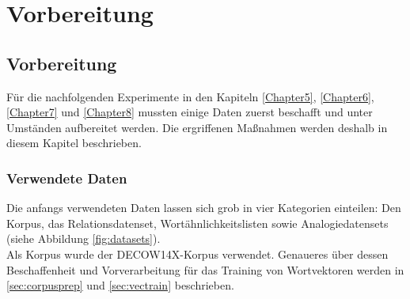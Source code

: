 
\chapter{Vorbereitung} %

\label{Chapter4} %


\section{Vorbereitung}

  Für die nachfolgenden Experimente in den Kapiteln \ref{Chapter5}, \ref{Chapter6}, \ref{Chapter7} und \ref{Chapter8}
  mussten einige Daten zuerst beschafft und unter Umständen aufbereitet werden. Die ergriffenen Maßnahmen werden
  deshalb in diesem Kapitel beschrieben.

  \subsection{Verwendete Daten}

  Die anfangs verwendeten Daten lassen sich grob in vier Kategorien einteilen: Den Korpus, das Relationsdatenset,
  Wortähnlichkeitslisten sowie Analogiedatensets (siehe Abbildung \ref{fig:datasets}).\\
  Als Korpus wurde der DECOW14X-Korpus verwendet. Genaueres über dessen Beschaffenheit und Vorverarbeitung für das
  Training von Wortvektoren werden in \ref{sec:corpusprep} und \ref{sec:vectrain} beschrieben.

